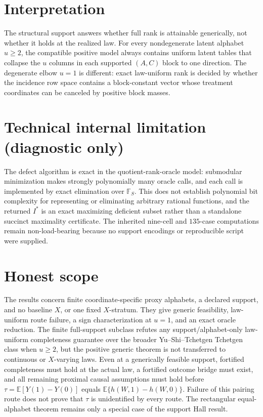 \documentclass{article}
\begin{document}
\section{Interpretation}

The structural support answers whether full rank is attainable generically, not whether it holds at the realized law. For every nondegenerate latent alphabet \(u\geq2\), the compatible positive model always contains uniform latent tables that collapse the \(u\) columns in each supported \((A,C)\) block to one direction. The degenerate elbow \(u=1\) is different: exact law-uniform rank is decided by whether the incidence row space contains a block-constant vector whose treatment coordinates can be canceled by positive block masses.

\section*{Technical internal limitation (diagnostic only)}

The defect algorithm is exact in the quotient-rank-oracle model: submodular minimization makes strongly polynomially many oracle calls, and each call is implemented by exact elimination over \(\mathbb F_S\). This does not establish polynomial bit complexity for representing or eliminating arbitrary rational functions, and the returned \(I^*\) is an exact maximizing deficient subset rather than a standalone succinct maximality certificate. The inherited nine-cell and \(135\)-case computations remain non-load-bearing because no support encodings or reproducible script were supplied.

\section{Honest scope}

The results concern finite coordinate-specific proxy alphabets, a declared support, and no baseline \(X\), or one fixed \(X\)-stratum. They give generic feasibility, law-uniform route failure, a sign characterization at \(u=1\), and an exact oracle reduction. The finite full-support subclass refutes any support/alphabet-only law-uniform completeness guarantee over the broader Yu--Shi--Tchetgen Tchetgen class when \(u\geq2\), but the positive generic theorem is not transferred to continuous or \(X\)-varying laws. Even at a generically feasible support, fortified completeness must hold at the actual law, a fortified outcome bridge must exist, and all remaining proximal causal assumptions must hold before \(\tau=\mathbb E[Y(1)-Y(0)]\) equals \(\mathbb E\{h(W,1)-h(W,0)\}\). Failure of this pairing route does not prove that \(\tau\) is unidentified by every route. The rectangular equal-alphabet theorem remains only a special case of the support Hall result.
\end{document}
